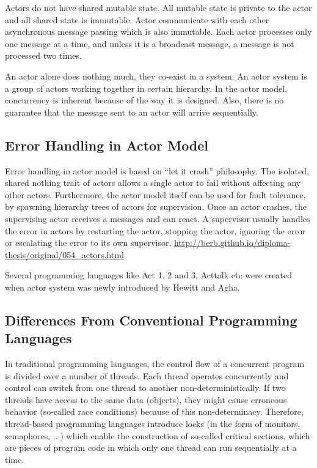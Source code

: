 Actors do not have shared mutable state. All mutable state is private to the actor and all shared state is immutable. Actor communicate with each other asynchronous message passing which is also immutable. Each actor processes only one message at a time, and unless it is a broadcast message, a message is not processed two times.

  An actor alone does nothing much, they co-exist in a system. An actor system is a group of actors working together in certain hierarchy.
  In the actor model, concurrency is inherent because of the way it is designed. Also, there is no guarantee that the message sent to an actor will arrive sequentially.~\cite{hewittVideo}

\subsection{Error Handling in Actor Model}

Error handling in actor model is based on “let it crash” philosophy. The isolated, shared nothing trait of actors allows a single actor to fail without affecting any other actors. Furthermore, the actor model itself can be used for fault tolerance, by spawning hierarchy trees of actors for supervision. Once an actor crashes, the supervising actor receives a messages and can react. A supervisor usually handles the error in actors by restarting the actor, stopping the actor, ignoring the error or escalating the error to its own supervisor. \url{http://berb.github.io/diploma-thesis/original/054_actors.html}

Several programming languages like Act 1, 2 and 3, Acttalk etc were created when actor system was newly introduced by Hewitt and Agha.

\subsection{Differences From Conventional Programming Languages}
In traditional programming languages, the control flow of a concurrent program is divided over a number of threads. Each thread operates concurrently and control can switch from one thread to another non-deterministically. If two threads have access to the same data (objects), they might cause erroneous behavior (so-called race conditions) because of this non-determinacy. Therefore, thread-based programming languages introduce locks (in the form of monitors, semaphores, ...) which enable the construction of so-called critical sections, which are pieces of program code in which only one thread can run sequentially at a time.

